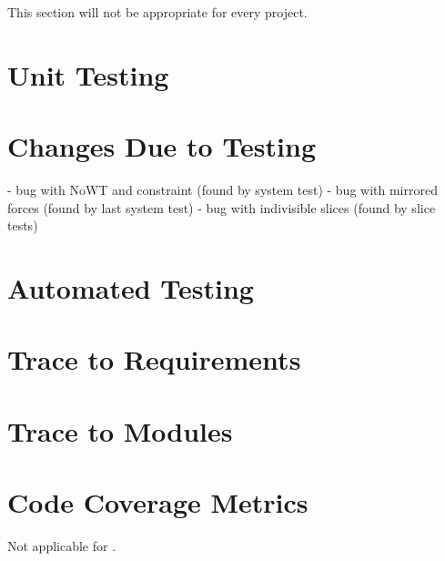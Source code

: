 \documentclass[12pt, titlepage]{article}
\begin{document}
This section will not be appropriate for every project.

\section{Unit Testing}  \label{sec_UnitTests}

\section{Changes Due to Testing} \label{sec_Changes}
- bug with NoWT and constraint (found by system test)
- bug with mirrored forces (found by last system test)
- bug with indivisible slices (found by slice tests)

\section{Automated Testing} \label{sec_AutoTests}
		
\section{Trace to Requirements} \label{sec_TraceReq}
		
\section{Trace to Modules} \label{sec_TraceMod}

\section{Code Coverage Metrics}
Not applicable for \progname.




\end{document}
